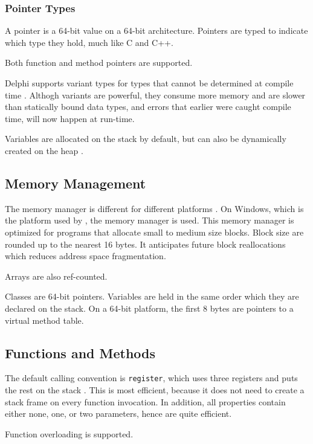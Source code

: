 \subsubsection{Pointer Types}
\label{ssub:Pointer Types}
A pointer is a 64-bit value on a 64-bit architecture. Pointers are typed to indicate which type they hold, much like C and C++.

Both function and method pointers are supported.

Delphi supports variant types for types that cannot be determined at compile time \cite{noauthor_undated-mx}. Althogh variants are powerful, they consume more memory and are slower than statically bound data types, and errors that earlier were caught compile time, will now happen at run-time.

Variables are allocated on the stack by default, but can also be dynamically created on the heap \cite{noauthor_undated-lw}.

\subsection{Memory Management}
\label{sub:Memory Management}
The memory manager is different for different platforms \cite{noauthor_undated-ys}. On Windows, which is the platform used by \gap, the  memory manager is used. This memory manager is optimized for programs that allocate small to medium size blocks. Block size are rounded up to the nearest 16 bytes. It anticipates future block reallocations which reduces address space fragmentation.

Arrays are also ref-counted.

Classes are 64-bit pointers. Variables are held in the same order which they are declared on the stack. On a 64-bit platform, the first 8 bytes are pointers to a virtual method table.

\subsection{Functions and Methods}
\label{sub:Functions and Methods}
The default calling convention is \texttt{register}, which uses three registers and puts the rest on the stack \cite{noauthor_undated-xi}. This is most efficient, because it does not need to create a stack frame on every function invocation. In addition, all properties contain either none, one, or two parameters, hence are quite efficient. 

Function overloading is supported.

